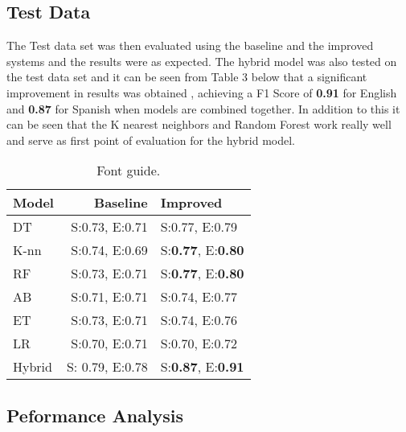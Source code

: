 \documentclass[10pt,a4paper]{article}
\begin{document}
\subsection{Test Data}
The Test data set was then evaluated using the baseline and the improved systems and the results were as expected. The hybrid model was also tested on the test data set and it can be seen from Table 3 below that a significant improvement in results was obtained , achieving a F1 Score of \textbf{0.91} for English and \textbf{0.87} for Spanish when models are combined together. In addition to this it can be seen that the K nearest neighbors and Random Forest work really well and serve as first point of evaluation for the hybrid model.
\begin{table}[!htbp]
\begin{center}
\begin{tabular}{|l|rl|}
\hline \bf Model & \bf Baseline & \bf Improved  \\ \hline
DT & S:0.73, E:0.71 & S:0.77, E:0.79 \\
K-nn & S:0.74, E:0.69 & S:\textbf{0.77}, E:\textbf{0.80} \\
RF &  S:0.73, E:0.71  & S:\textbf{0.77}, E:\textbf{0.80} \\
AB  &  S:0.71, E:0.71  & S:0.74, E:0.77 \\
ET &  S:0.73, E:0.71  & S:0.74, E:0.76 \\
LR &  S:0.70, E:0.71  & S:0.70, E:0.72 \\
Hybrid &  S: 0.79, E:0.78  & S:\textbf{0.87}, E:\textbf{0.91} \\
\hline
\end{tabular}
\end{center}

\caption{\label{font-table} Font guide. }
\end{table}


\subsection{Peformance Analysis}
\label{sect:pdf}
\end{document}
